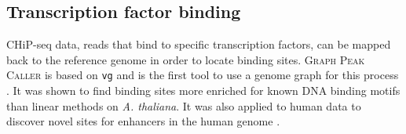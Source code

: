 



%


\subsection{Transcription factor binding}

CHiP-seq data, reads that bind to specific transcription factors, can be mapped back to the reference genome in order to locate binding sites.
\textsc{Graph Peak Caller} is based on \texttt{vg} and is the first tool to use a genome graph for this process \cite{Grytten_2019}.
It was shown to find binding sites more enriched for known DNA binding motifs than linear methods on \emph{A. thaliana}.
It was also applied to human data to discover novel sites for enhancers in the human genome \cite{groza2019personalized}. 


